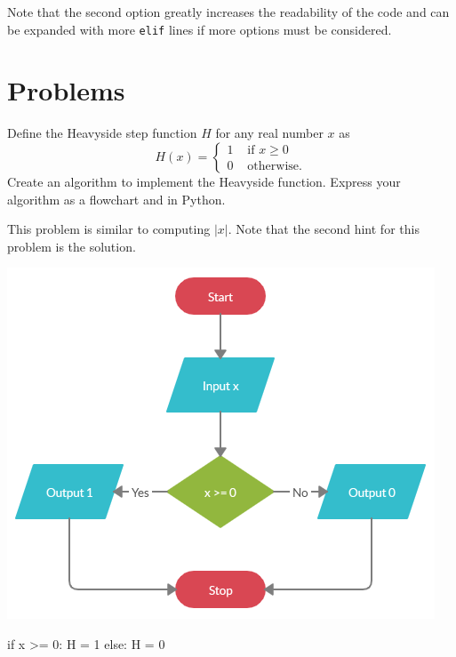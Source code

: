 \documentclass{ximera}
\begin{document}
Note that the second option greatly increases the readability of the code and can be expanded with more \verb|elif| lines if more options must be considered.

\section{Problems}

\begin{question}
Define the Heavyside step function $H$ for any real number $x$ as
	$$H(x)=\begin{cases} 1 &\text{ if $x\geq 0$}\\
		0 &\text{ otherwise.}
	\end{cases}$$
Create an algorithm to implement the Heavyside function. Express your algorithm as a flowchart and in Python.
	\begin{hint}
		This problem is similar to computing $|x|$. Note that the second hint for this problem is the solution.
	\end{hint}
	\begin{hint}
	\begin{center}
		\includegraphics{heavy.png}
	\end{center}
\begin{sageCell}
if x >= 0:
        H = 1
else:
        H = 0
\end{sageCell}
	\end{hint}
\end{question}
\end{document}
